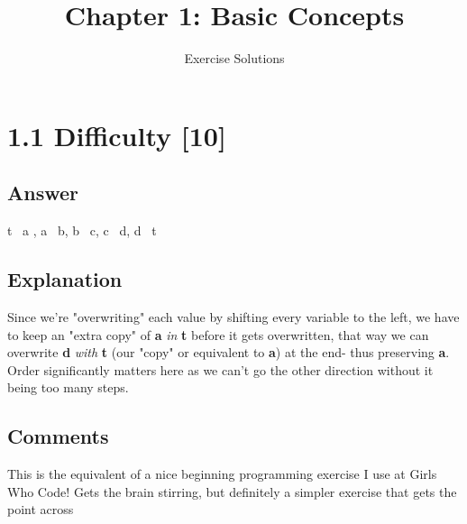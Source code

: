 \documentclass{article}
\title{Chapter 1: Basic Concepts}
\author{Exercise Solutions}
\date{}
\begin{document}
\maketitle

\section*{1.1 Difficulty [10]}

\subsection*{Answer}
t \textleftarrow\ a , a \textleftarrow\ b, b \textleftarrow\ c, 
c \textleftarrow\ d, d \textleftarrow\ t
\subsection*{Explanation}
Since we're "overwriting" each value by shifting every variable to the left, 
we have to keep an "extra copy" of \textbf{a} \textit{in} \textbf{t} before it gets overwritten, that way we can
overwrite \textbf{d} \textit{with} \textbf{t} (our "copy" or equivalent to \textbf{a}) at the end- thus
preserving \textbf{a}. Order significantly matters here as we can't go the other direction
 without it being too many steps.
\subsection*{Comments}
This is the equivalent of a nice beginning programming exercise I use
at Girls Who Code! Gets the brain stirring, but definitely a simpler 
exercise that gets the point across
\end{document}
